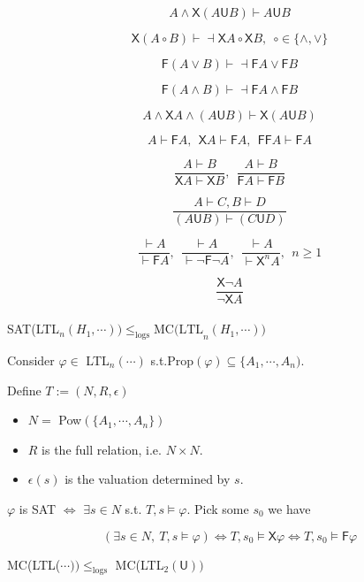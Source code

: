 \documentclass[12pt]{article}
\begin{document}
$${A\wedge \textsf{X}(A\textsf{U}B)}\vdash {A\textsf{U}B}$$

$$\textsf{X}(A\circ B)\vdash\dashv \textsf{X}A\circ\textsf{X}B,\ \ \circ\in\{\wedge,\vee\}$$

$$\textsf{F}(A\vee B)\vdash \dashv \textsf{F}A\vee\textsf{F}B$$ %

$$\textsf{F}(A\wedge B)\vdash \dashv \textsf{F}A\wedge\textsf{F}B$$ %

$${A\wedge\textsf{X}A\wedge (A\textsf{U}B)}\vdash {\textsf{X}(A\textsf{U}B)}$$

$${A}\vdash {\textsf{F}A},\ \ {\textsf{X}A}\vdash {\textsf{F}A},\ \ {\textsf{FF}A}\vdash {\textsf{F}A}$$

$$\frac{A\vdash B}{\textsf{X}A\vdash \textsf{X}B},\ \ \frac{A\vdash B}{\textsf{F}A\vdash \textsf{F}B}  $$

$$\frac{A\vdash C, B\vdash D}{(A\textsf{U}B)\vdash (C\textsf{U}D)}$$

$$\frac{\vdash A}{\vdash \textsf{F}A}, \ \ \frac{\vdash A}{\vdash \neg \textsf{F}\neg A},\ \ \frac{\vdash A}{\vdash \textsf{X}^nA},\ \ n\geq 1$$


$$\frac{\textsf{X}\neg A}{\neg \textsf{X}A}$$
\ \\

SAT(LTL$_n(H_1,\cdots))\leq_{\text{logs}}\mbox{MC(LTL}_n(H_1,\cdots))$

Consider $\varphi\in$ LTL$_n(\cdots)$ s.t.Prop$(\varphi)\subseteq\{A_1,\cdots, A_n)$.

Define $T:=(N, R, \epsilon)$ 

\begin{itemize}
\item $N=$ Pow$(\{A_1,\cdots, A_n\})$

\item $R$ is the full relation, i.e. $N\times N$.

\item $\epsilon(s)$ is the valuation determined by $s$.
\end{itemize}

$\varphi$ is SAT  $\Longleftrightarrow$ $\exists s\in N$ s.t. $T,s\models \varphi$. Pick some $s_0$ we have

$$(\exists s\in N,\ T,s\models \varphi) \Longleftrightarrow T,s_0\models \textsf{X}\varphi\Longleftrightarrow T,s_0\models\textsf{F}\varphi$$


MC(LTL($\cdots))\leq_{\text{logs}}$ MC(LTL$_2(\textsf{U}))$ 
\end{document}
